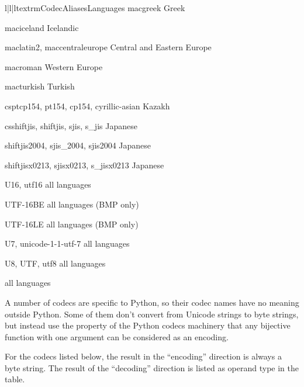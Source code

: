 \begin{longtableiii}{l|l|l}{textrm}{Codec}{Aliases}{Languages}
        {macgreek}
        {Greek}

        {maciceland}
        {Icelandic}

        {maclatin2, maccentraleurope}
        {Central and Eastern Europe}

        {macroman}
        {Western Europe}

        {macturkish}
        {Turkish}

        {csptcp154, pt154, cp154, cyrillic-asian}
        {Kazakh}

        {csshiftjis, shiftjis, sjis, s_jis}
        {Japanese}

        {shiftjis2004, sjis_2004, sjis2004}
        {Japanese}

        {shiftjisx0213, sjisx0213, s_jisx0213}
        {Japanese}

        {U16, utf16}
        {all languages}

        {UTF-16BE}
        {all languages (BMP only)}

        {UTF-16LE}
        {all languages (BMP only)}

        {U7, unicode-1-1-utf-7}
        {all languages}

        {U8, UTF, utf8}
        {all languages}

        {}
        {all languages}

\end{longtableiii}

A number of codecs are specific to Python, so their codec names have
no meaning outside Python. Some of them don't convert from Unicode
strings to byte strings, but instead use the property of the Python
codecs machinery that any bijective function with one argument can be
considered as an encoding.

For the codecs listed below, the result in the ``encoding'' direction
is always a byte string. The result of the ``decoding'' direction is
listed as operand type in the table.

